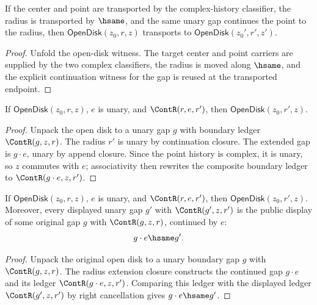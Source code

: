 \begin{lemma}
\label{lem:open-disk-endpoint-transport}
If the center and point are transported by the complex-history classifier, the radius is transported by \(\hsame\), and the same unary gap continues the point to the radius, then \(\mathsf{OpenDisk}(z_0, r, z)\) transports to \(\mathsf{OpenDisk}(z_0', r', z')\).
\end{lemma}
\begin{proof}
Unfold the open-disk witness. The target center and point carriers are supplied by the two complex classifiers, the radius is moved along \(\hsame\), and the explicit continuation witness for the gap is reused at the transported endpoint.
\end{proof}

\begin{theorem}
\label{thm:open-disk-radius-extension-closed}
If \(\mathsf{OpenDisk}(z_0,r,z)\), \(e\) is unary, and
\(\ContR(r,e,r')\), then \(\mathsf{OpenDisk}(z_0,r',z)\).
\end{theorem}
\begin{proof}
Unpack the open disk to a unary gap \(g\) with boundary ledger
\(\ContR(g,z,r)\). The radius \(r'\) is unary by continuation closure.
The extended gap is \(g\cdot e\), unary by append closure. Since the point history
is complex, it is unary, so \(z\) commutes with \(e\); associativity then
rewrites the composite boundary ledger to
\(\ContR(g\cdot e,z,r')\).
\end{proof}

\begin{theorem}
\label{thm:open-disk-radius-extension-gap-public-readback}
If \(\mathsf{OpenDisk}(z_0,r,z)\), \(e\) is unary, and
\(\ContR(r,e,r')\), then \(\mathsf{OpenDisk}(z_0,r',z)\). Moreover, every
displayed unary gap \(g'\) with \(\ContR(g',z,r')\) is the public display of
some original gap \(g\) with \(\ContR(g,z,r)\), continued by \(e\):
$$
g\cdot e \hsame g'.
$$
\end{theorem}
\begin{proof}
Unpack the original open disk to a unary boundary gap \(g\) with
\(\ContR(g,z,r)\). The radius extension closure constructs the continued gap
\(g\cdot e\) and its ledger \(\ContR(g\cdot e,z,r')\). Comparing this ledger
with the displayed ledger \(\ContR(g',z,r')\) by right cancellation gives
\(g\cdot e\hsame g'\).
\end{proof}

